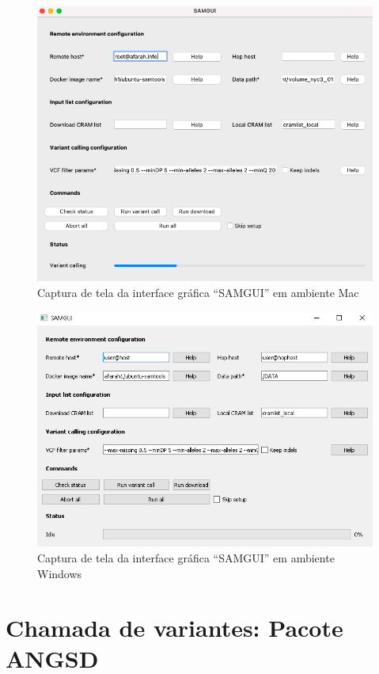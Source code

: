 \documentclass[cic,tc]{iiufrgs}
\begin{document}
{\begin{figure}
  \caption{Captura de tela da interface gráfica ``SAMGUI'' em ambiente Mac}
    \begin{center}
      \includegraphics[width=0.85\linewidth]{img/samgui_mac.png}
    \end{center}
    \label{fig:samgui_mac}
\end{figure}

\begin{figure}
  \caption{Captura de tela da interface gráfica ``SAMGUI'' em ambiente Windows}
    \begin{center}
      \includegraphics[width=0.85\linewidth]{img/samgui_windows.png}
    \end{center}
    \label{fig:samgui_windows}
\end{figure}

\section{Chamada de variantes: Pacote ANGSD}
\label{sec:angsd}

}
\end{document}
